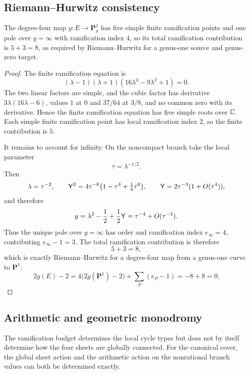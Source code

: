 \subsection{Riemann--Hurwitz consistency}\label{subsec:riemann-hurwitz}
\begin{corollary}\label{cor:riemann-hurwitz}
The degree-four map $y:E\to\mathbf P^1_y$ has five simple finite ramification points and one pole over $y=\infty$ with ramification index $4$, so its total ramification contribution is $5+3=8$, as required by Riemann--Hurwitz for a genus-one source and genus-zero target.
\end{corollary}
\begin{proof}
The finite ramification equation is
\[
(\lambda-1)(\lambda+1)(16\lambda^3-9\lambda^2+1)=0.
\]
The two linear factors are simple, and the cubic factor has derivative \(3\lambda(16\lambda-6)\), values \(1\) at \(0\) and \(37/64\) at \(3/8\), and no common zero with its derivative.  Hence the finite ramification equation has five simple roots over \(\mathbb{C}\).  Each simple finite ramification point has local ramification index \(2\), so the finite contribution is \(5\).

It remains to account for infinity.  On the noncompact branch take the local parameter
\[
\tau=\lambda^{-1/2}.
\]
Then
\[
\lambda=\tau^{-2},
\qquad
\mathsf{Y}^2=4\tau^{-6}\bigl(1-\tau^4+\tfrac14\tau^6\bigr),
\qquad
\mathsf{Y}=2\tau^{-3}(1+O(\tau^4)),
\]
and therefore
\[
y=\lambda^2-\frac12+\frac12\mathsf{Y}=\tau^{-4}+O(\tau^{-3}).
\]
Thus the unique pole over \(y=\infty\) has order and ramification index \(e_\infty=4\), contributing \(e_\infty-1=3\).  The total ramification contribution is therefore
\[
5+3=8,
\]
which is exactly Riemann--Hurwitz for a degree-four map from a genus-one curve to \(\mathbf P^1\):
\[
2g(E)-2=4\bigl(2g(\mathbf P^1)-2\bigr)+\sum_P(e_P-1)=-8+8=0.
\]
\end{proof}

\subsection{Arithmetic and geometric monodromy}\label{subsec:monodromy}

The ramification budget determines the local cycle types but does not by
itself determine how the four sheets are globally connected.  For the
canonical cover, the global sheet action and the arithmetic action on the
nonrational branch values can both be determined exactly.

